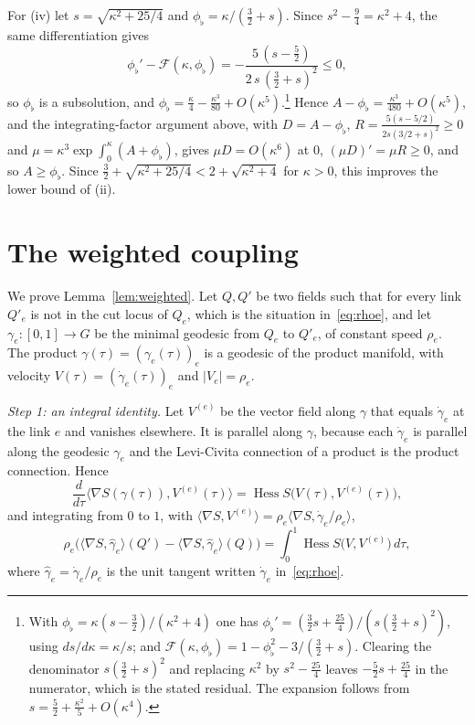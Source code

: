 \documentclass[aps,prd,twocolumn,superscriptaddress,nofootinbib,longbibliography,floatfix,amsmath,amssymb,10pt]{revtex4-2}
\theoremstyle{definition}
\theoremstyle{remark}
\newcommand{\Hess}{\operatorname{Hess}}
\newcommand{\ip}[2]{\langle #1,#2\rangle}
\begin{document}
For (iv) let $s=\sqrt{\kappa^2+25/4}$ and $\phi_\flat=\kappa/(\frac32+s)$.
Since $s^2-\frac94=\kappa^2+4$, the same differentiation gives
\[
\phi_\flat'-\mathcal F(\kappa,\phi_\flat)=-\frac{5\,(s-\frac52)}{2\,s\,
(\frac32+s)^2}\le0,
\]
so $\phi_\flat$ is a subsolution, and $\phi_\flat=\frac\kappa4-\frac{\kappa^3}
{80}+O(\kappa^5)$.\footnote{With $\phi_\flat=\kappa(s-\frac32)/(\kappa^2+4)$ one
has $\phi_\flat'=(\frac32 s+\frac{25}4)/(s(\frac32+s)^2)$, using $ds/d\kappa=
\kappa/s$; and $\mathcal F(\kappa,\phi_\flat)=1-\phi_\flat^2-3/(\frac32+s)$.
Clearing the denominator $s(\frac32+s)^2$ and replacing $\kappa^2$ by
$s^2-\frac{25}4$ leaves $-\frac52 s+\frac{25}4$ in the numerator, which is the
stated residual. The expansion follows from $s=\frac52+\frac{\kappa^2}5+
O(\kappa^4)$.} Hence $A-\phi_\flat=\frac{\kappa^3}{480}+O(\kappa^5)$, and the
integrating-factor argument above, with $D=A-\phi_\flat$, $R=\frac{5(s-5/2)}
{2s(3/2+s)^2}\ge0$ and $\mu=\kappa^3\exp\int_0^\kappa(A+\phi_\flat)$, gives
$\mu D=O(\kappa^6)$ at $0$, $(\mu D)'=\mu R\ge0$, and so $A\ge\phi_\flat$. Since
$\frac32+\sqrt{\kappa^2+25/4}<2+\sqrt{\kappa^2+4}$ for $\kappa>0$, this
improves the lower bound of (ii).

\section{The weighted coupling}\label{app:weighted}

We prove Lemma~\ref{lem:weighted}. Let $Q,Q'$ be two fields such that for
every link $Q'_e$ is not in the cut locus of $Q_e$, which is the situation
in~\eqref{eq:rhoe}, and let $\gamma_e\colon[0,1]\to G$ be the minimal geodesic
from $Q_e$ to $Q'_e$, of constant speed $\rho_e$. The product
$\gamma(\tau)=(\gamma_e(\tau))_e$ is a geodesic of the product manifold, with
velocity $V(\tau)=(\dot\gamma_e(\tau))_e$ and $|V_e|=\rho_e$.

\emph{Step 1: an integral identity.} Let $V^{(e)}$ be the vector field along
$\gamma$ that equals $\dot\gamma_e$ at the link $e$ and vanishes elsewhere.
It is parallel along $\gamma$, because each $\dot\gamma_e$ is parallel along
the geodesic $\gamma_e$ and the Levi-Civita connection of a product is the
product connection. Hence
\[
\frac d{d\tau}\ip{\nabla S(\gamma(\tau))}{V^{(e)}(\tau)}=\Hess S\bigl(V(\tau),
V^{(e)}(\tau)\bigr),
\]
and integrating from $0$ to $1$, with $\ip{\nabla S}{V^{(e)}}=\rho_e\ip{\nabla
S}{\dot\gamma_e/\rho_e}$,
\begin{equation}\label{eq:keyid}
\rho_e\bigl(\ip{\nabla S}{\hat\gamma_e}(Q')-\ip{\nabla S}{\hat\gamma_e}(Q)
\bigr)=\int_0^1\Hess S\bigl(V,V^{(e)}\bigr)\,d\tau,
\end{equation}
where $\hat\gamma_e=\dot\gamma_e/\rho_e$ is the unit tangent written
$\dot\gamma_e$ in~\eqref{eq:rhoe}.
\end{document}
